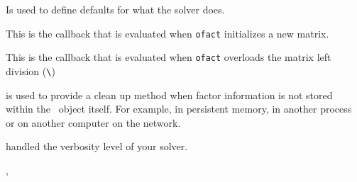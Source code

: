 
Is used to define defaults for what the solver does. 


This is the callback that is evaluated when {\tt ofact} initializes a new matrix.


This is the callback that is evaluated when {\tt ofact} overloads the matrix left division ({\tt \verb+\+})


 is used to provide a clean up method when factor information is not stored within the \ofact\ object itself. For example, in persistent memory, in another process or on another computer on the network.


 handled the verbosity level of your solver.


 \feeig, \fereduc


